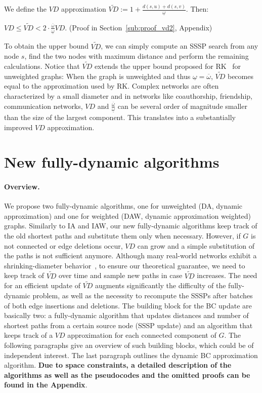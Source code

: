 \documentclass[english]{llncs}
\newcommand{\vd}{$\mathit{VD}$\xspace}
\newcommand{\rk}{\textsf{RK}\xspace}
\newcommand{\da}{\textsf{DA}\xspace}
\newcommand{\daw}{\textsf{DAW}\xspace}
\newcommand{\vda}{$\tilde{\mathit{VD}}$\xspace}
\begin{document}
We define the \vd approximation $\tilde{\mathit{VD}} := 1 + \frac{d(s,u)+d(s,v)}{\underline{\omega}}$. Then:
\begin{proposition}
\label{lem:vd2}
$\mathit{VD} \leq \tilde{\mathit{VD}} < 2 \cdot \frac{\overline{\omega}}{\underline{\omega}} \mathit{VD} $. (Proof in Section~\ref{sub:proof_vd2}, Appendix)
\end{proposition}
To obtain the upper bound \vda, we can simply compute an SSSP search from any node $s$, find the two nodes with maximum distance and perform the remaining calculations.
Notice that \vda extends the upper bound proposed for \rk~\cite{DBLP:conf/wsdm/RiondatoK14} for unweighted graphs: When the graph is unweighted and thus $\underline{\omega} = \overline{\omega}$, \vda becomes equal to the approximation used by \rk.
Complex networks are often characterized by a small diameter and in networks like coauthorship, friendship, communication networks, \vd and $ \frac{\overline{\omega}}{\underline{\omega}}$ can be several order of magnitude smaller than the size of the largest component. This translates into a substantially improved \vd approximation.


\section{New fully-dynamic algorithms}
\paragraph{Overview.}
We propose two fully-dynamic algorithms, one for unweighted (\da, dynamic approximation) and one for weighted (\daw, dynamic approximation weighted) graphs. Similarly to \textsf{IA} and \textsf{IAW}, our new fully-dynamic algorithms keep track of the old shortest paths and substitute them only when necessary. However, if $G$ is not connected or edge deletions occur, \vd can grow and a simple substitution of the paths is not sufficient anymore. 
Although many real-world networks exhibit a shrinking-diameter behavior~\cite{DBLP:conf/kdd/LeskovecKF05}, to ensure our theoretical guarantee, we need to keep track of \vda over time and sample new paths in case \vda increases.
The need for an efficient update of \vda augments significantly the difficulty of the fully-dynamic problem, as well as the necessity to recompute the SSSPs after batches of both edge insertions and deletions. 
The building block for the BC update are basically two: a fully-dynamic algorithm that updates distances and number of shortest paths from a certain source node (SSSP update) and an algorithm that keeps track of a \vd approximation for each connected component of $G$. The following paragraphs give an overview of such building blocks, which could be of independent interest. The last paragraph outlines the dynamic BC approximation algorithm. \textbf{Due to space constraints, a detailed description of the algorithms as well as the pseudocodes and the omitted proofs can be found in the Appendix}.
\end{document}
